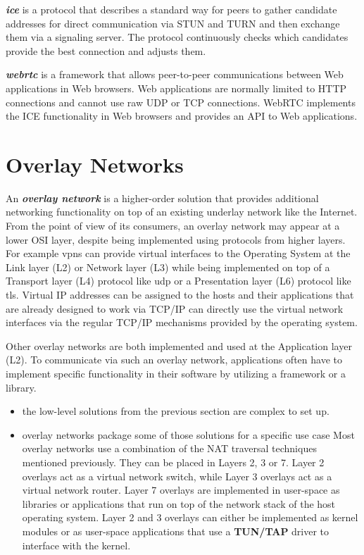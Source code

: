 \textbf{\emph{\gls{ice}}} is a protocol that describes a standard way
for peers to gather candidate addresses for direct communication via
STUN and TURN and then exchange them via a signaling server. The
protocol continuously checks which candidates provide the best
connection and adjusts them.

\textbf{\emph{\gls{webrtc}}} is a framework that allows peer-to-peer
communications between Web applications in Web browsers. Web
applications are normally limited to HTTP connections and cannot use raw
UDP or TCP connections. WebRTC implements the ICE functionality in Web
browsers and provides an API to Web applications.


\hypertarget{sec:overlays}{%
\chapter{Overlay Networks}\label{sec:overlays}}

An \textbf{\emph{overlay network}} is a higher-order solution that
provides additional networking functionality on top of an existing
underlay network like the Internet. From the point of view of its
consumers, an overlay network may appear at a lower OSI layer, despite
being implemented using protocols from higher layers. For example
\glspl{vpn} can provide virtual interfaces to the Operating System at
the Link layer (L2) or Network layer (L3) while being implemented on top
of a Transport layer (L4) protocol like \gls{udp} or a Presentation
layer (L6) protocol like \gls{tls}. Virtual IP addresses can be assigned
to the hosts and their applications that are already designed to work
via TCP/IP can directly use the virtual network interfaces via the
regular TCP/IP mechanisms provided by the operating system.

Other overlay networks are both implemented and used at the Application
layer (L2). To communicate via such an overlay network, applications
often have to implement specific functionality in their software by
utilizing a framework or a library.

\begin{itemize}
\tightlist
\item
  the low-level solutions from the previous section are complex to set
  up.
\item
  overlay networks package some of those solutions for a specific use
  case Most overlay networks use a combination of the NAT traversal
  techniques mentioned previously. They can be placed in Layers 2, 3 or
  7. Layer 2 overlays act as a virtual network switch, while Layer 3
  overlays act as a virtual network router. Layer 7 overlays are
  implemented in user-space as libraries or applications that run on top
  of the network stack of the host operating system. Layer 2 and 3
  overlays can either be implemented as kernel modules or as user-space
  applications that use a \textbf{TUN/TAP} 
  driver to interface with the kernel.
\end{itemize}

